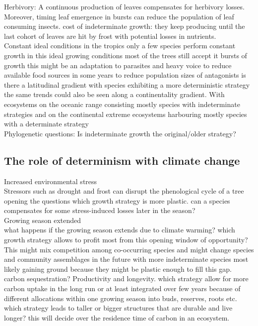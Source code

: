 \documentclass{article}
\begin{document}
	Herbivory: A continuous production of leaves compensates for herbivory losses. Moreover, timing leaf emergence in bursts can reduce the population of leaf consuming insects.
	cost of indeterminate growth: they keep producing until the last cohort of leaves are hit by frost with potential losses in nutrients. \\
	Constant ideal conditions in the tropics only a few species perform constant growth in this ideal growing conditions most of the trees still accept it bursts of growth this might be an adaptation to parasites and heavy voice to reduce available food sources in some years to reduce population sizes of antagonists is there a latitudinal gradient with species exhibiting a more deterministic strategy the same trends could also be seen along a continentality gradient. With ecosystems on the oceanic range consisting mostly species with indeterminate strategies and on the continental extreme ecosystems harbouring mostly species with a determinate strategy\\
	
	Phylogenetic questions: Is indeterminate growth the original/older strategy?\\
	
	\subsection*{The role of determinism with climate change}
	Increased environmental stress\\
	Stressors such as drought and frost can disrupt the phenological cycle of a tree opening the questions which growth strategy is more plastic. can a species compensates for some stress-induced losses later in the season?\\
	
	Growing season extended\\
	what happens if the growing season extends due to climate warming? which growth strategy allows to profit most from this opening window of opportunity? This might mix competition among co-occurring species and might change species and community assemblages in the future with more indeterminate species most likely gaining ground because they might be plastic enough to fill this gap. \\
	carbon sequestration? Productivity and longevity. which strategy allow for more carbon uptake in the long run or at least integrated over few years because of different allocations within one growing season into buds, reserves, roots etc.
	which strategy leads to taller or bigger structures that are durable and live longer? this will decide over the residence time of carbon in an ecosystem.
	\\
	\pagebreak
	\newpage
	
	
	
	
	
\end{document}
